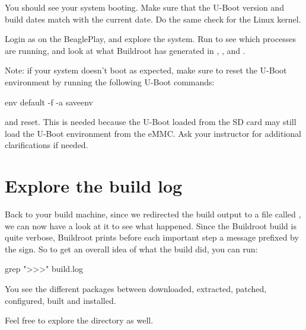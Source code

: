 You should see your system booting. Make sure that the U-Boot version
and build dates match with the current date. Do the same check for the
Linux kernel.

Login as  on the BeaglePlay, and explore the system. Run
 to see which processes are running, and look at what
Buildroot has generated in , ,  and
.

Note: if your system doesn't boot as expected, make sure to reset the
U-Boot environment by running the following U-Boot commands:

\begin{bashinput}
env default -f -a
saveenv
\end{bashinput}

and reset. This is needed because the U-Boot loaded from the SD card
may still load the U-Boot environment from the eMMC. Ask your
instructor for additional clarifications if needed.

\section{Explore the build log}

Back to your build machine, since we redirected the build output to a
file called , we can now have a look at it to see what
happened. Since the Buildroot build is quite verbose, Buildroot prints
before each important step a message prefixed by the \code{>>>}
sign. So to get an overall idea of what the build did, you can run:

\begin{bashinput}
grep ">>>" build.log
\end{bashinput}

You see the different packages between downloaded, extracted, patched,
configured, built and installed.

Feel free to explore the  directory as well.
